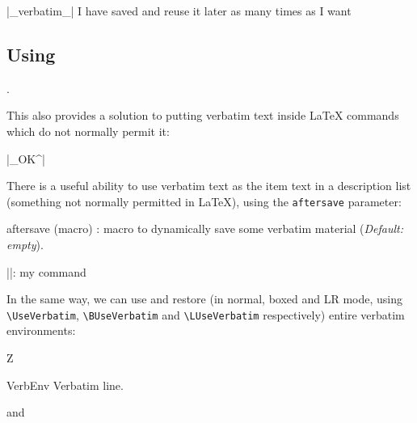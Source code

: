 \documentclass[twoside]{article}
\newcommand\cs[1]{\texttt{\textbackslash#1}}
\providecommand\optname[1]{\textsf{#1}}
\newenvironment{optlist}{\begin{description}%
  \renewcommand\makelabel[1]{%
    \descriptionlabel{\mdseries\optname{##1}}}%
  \itemsep0.25\itemsep}%
 {\end{description}}
\begin{document}
\begin{SideBySideExample}
  \DefineShortVerb{\|}
  |_verbatim_|
  I have saved  and reuse 
  it later as many times as I want
  \subsection*{Using }
  .
\end{SideBySideExample}

  This also provides a solution to putting verbatim text inside \LaTeX{}
commands which do not normally permit it: %

{
\begin{Example}
  \DefineShortVerb{\|}|_OK^| 
\end{Example}
}

  There is a useful ability to use verbatim text as the item text in a
description list (something not normally permitted in \LaTeX), using the
\texttt{aftersave} parameter:

\begin{optlist}
  \item[aftersave (macro)]: macro to dynamically save some verbatim material
  (\emph{Default: empty}).
\end{optlist}

\begin{SideBySideExample}
  \newcommand{\Vitem}{%
    }
  \DefineShortVerb{\|}
  \begin{description}
    \Vitem|\MyCommand|: my command
  \end{description}
\end{SideBySideExample}

  In the same way, we can use and restore (in normal, boxed and LR mode,
using \cs{UseVerbatim}, \cs{BUseVerbatim} and \cs{LUseVerbatim} respectively)
entire verbatim environments:

\begin{SideBySideExample}
  Z
  \begin{SaveVerbatim}{VerbEnv}
    Verbatim line.
  \end{SaveVerbatim}
  and 
\end{SideBySideExample}
\end{document}
